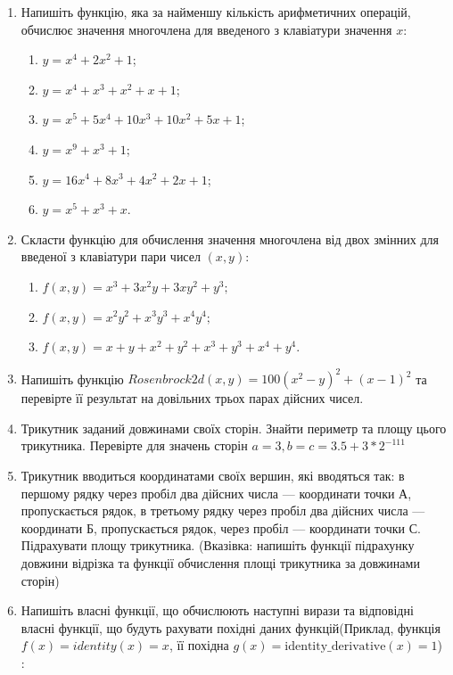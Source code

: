 \documentclass[]{article}
\makeatletter
\newcommand{\xslalph}[1]{\expandafter\@xslalph\csname c@#1\endcsname}
\newcommand{\@xslalph}[1]{%
    \ifcase#1\or а\or б\or в\or г\or д\or e\or є\or ж\or з\or i%
    \or й\or к\or л\or м\or н\or о\or п\or р\or с\or т%
    \or у\or ф\or х\or ц\or ч\or ш\or ю\or я\or аа\or бб\or вв %
    \else\@ctrerr\fi%
}
\makeatother
\begin{document}
\begin{enumerate}
\def\labelenumi{\arabic{enumi}.}
\item
 Напишіть функцію, яка за найменшу кількість арифметичних операцій,
  обчислює значення многочлена для введеного з клавіатури значення
  $x$:
  \begin{enumerate}[label=\xslalph*)]
  \item \(y = x^{4} + 2x^{2} + 1\); 
  \item \(y = x^{4} + x^{3} + x^{2} + x + 1\);
  \item \(y = x^{5} + 5x^{4} + 10x^{3} + 10x^{2} + 5x + 1\);
  \item \(y = x^{9} + x^{3} + 1\);
  \item \(y = 16x^{4} + 8x^{3} + 4x^{2} + 2x + 1\); 
  \item \(y = x^{5} + x^{3} + x\).
  \end{enumerate}
\item
 Скласти функцію для обчислення значення многочлена від двох змінних
  для введеної з клавіатури пари чисел \((x,y)\):
  \begin{enumerate}[label=\xslalph*)]
    \item
    \(f(x,y) = x^{3} + 3x^{2}y + 3xy^{2} + y^{3};\)
    \item
    \(f(x,y) = x^{2}y^{2} + x^{3}y^{3} + x^{4}y^{4};\)
    \item
    \(f(x,y) = x + y + x^{2} + y^{2} + x^{3} + y^{3} + x^{4} + y^{4}\).
  \end{enumerate}
\item
  Напишіть функцію $ Rosenbrock2d(x,y) = 100(x^{2} - y)^{2} + (x - 1)^{2}$ 
 та перевірте її результат на довільних трьох парах дійсних чисел.
\item
Трикутник заданий довжинами своїх сторін. Знайти периметр та площу цього
трикутника. Перевірте для значень сторін
\(a = 3,b = c = 3.5 + 3*2^{- 111}\)
\item
Трикутник вводиться координатами своїх вершин, які вводяться так: в
першому рядку через пробіл два дійсних числа --- координати точки А,
пропускається рядок, в третьому рядку через пробіл два дійсних числа ---
координати Б, пропускається рядок, через пробіл --- координати точки С.
Підрахувати площу трикутника. (Вказівка: напишіть функції підрахунку
довжини відрізка та функції обчислення площі трикутника за довжинами
сторін)
\item
  Напишіть власні функції, що обчислюють наступні вирази та відповідні
  власні функції, що будуть рахувати похідні даних функцій(Приклад,
  функція \(f(x) = identity(x) = x\), її похідна
  \(g(x) = \textrm{identity\_derivative}(x) = 1\)) :



\end{enumerate}
\end{document}
